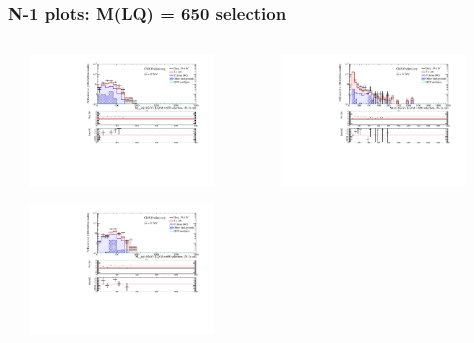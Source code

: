 \documentclass[bigger]{beamer}
\begin{document}
\begin{frame}
\frametitle{\eejj N-1 plots: M(LQ) = 650 selection}
\label{sec-1-12-2}
\begin{columns} %
\label{sec-1-12-2-1}
\begin{column}{0.55\textwidth}
\label{sec-1-12-2-1-1}
\label{sec-1-12-2-1-1-1}

\centering
\includegraphics[width=0.8\textwidth]{fig/ee/nMinus1/Mej_selected_min_StAndMeeLQ650_eejj.pdf}
\label{sec-1-12-2-1-1-2}

\centering
\includegraphics[width=0.8\textwidth]{fig/ee/nMinus1/Mej_selected_avg_StAndMeeLQ650_eejj.pdf}
\end{column}
\begin{column}{0.55\textwidth}
\label{sec-1-12-2-1-2}
\label{sec-1-12-2-1-2-1}

\centering
\includegraphics[width=0.8\textwidth]{fig/ee/nMinus1/Mee_StAndMejLQ650_eejj.pdf}
\label{sec-1-12-2-1-2-2}



\end{column}
\end{columns}
\end{frame}
\end{document}
